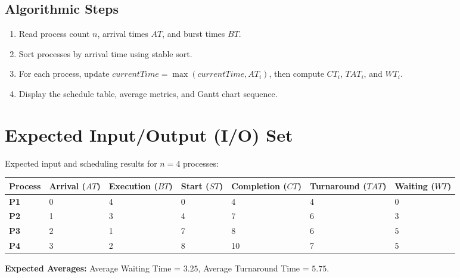 \documentclass[10pt,a4paper]{article}
\begin{document}
\subsection{Algorithmic Steps}
\begin{enumerate}[noitemsep,topsep=1pt,leftmargin=1.4em]
  \item Read process count $n$, arrival times $AT$, and burst times $BT$.
  \item Sort processes by arrival time using stable sort.
  \item For each process, update $currentTime = \max(currentTime, AT_i)$, then compute $CT_i$, $TAT_i$, and $WT_i$.
  \item Display the schedule table, average metrics, and Gantt chart sequence.
\end{enumerate}

\section{Expected Input/Output (I/O) Set}
Expected input and scheduling results for $n = 4$ processes:

\vspace{-2pt}
\begin{table}[h!]
\centering\footnotesize
\renewcommand{\arraystretch}{1.08}
\begin{tabularx}{\linewidth}{YYYYYYY}
\toprule
\textbf{Process} & \textbf{Arrival ($AT$)} & \textbf{Execution ($BT$)} & \textbf{Start ($ST$)} & \textbf{Completion ($CT$)} & \textbf{Turnaround ($TAT$)} & \textbf{Waiting ($WT$)} \\
\midrule
\textbf{P1} & 0 & 4 & 0 & 4  & 4 & 0 \\
\textbf{P2} & 1 & 3 & 4 & 7  & 6 & 3 \\
\textbf{P3} & 2 & 1 & 7 & 8  & 6 & 5 \\
\textbf{P4} & 3 & 2 & 8 & 10 & 7 & 5 \\
\bottomrule
\end{tabularx}
\end{table}
\vspace{-6pt}

\noindent\textbf{Expected Averages:} Average Waiting Time = $3.25$, Average Turnaround Time = $5.75$.

\end{document}
